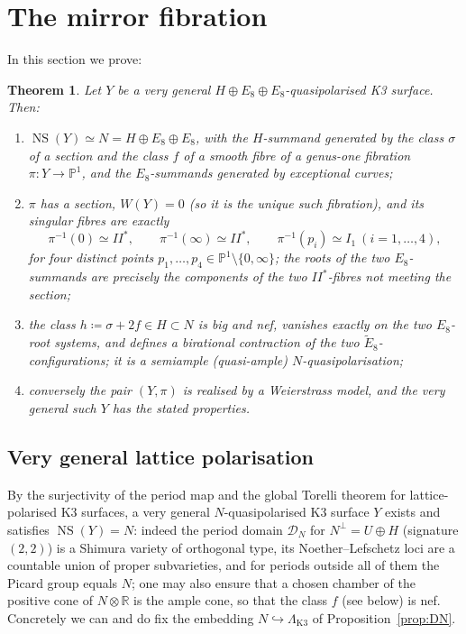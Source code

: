 \documentclass[11pt]{article}
\newtheorem{theorem}{Theorem}[section]
\newcommand{\PP}{\mathbb{P}}
\newcommand{\bR}{\mathbb{R}}
\DeclareMathOperator{\NS}{NS}
\begin{document}
\section{The mirror fibration}\label{sec:fibration}

In this section we prove:

\begin{theorem}\label{thm:fibration}
Let $Y$ be a very general $H\oplus E_8\oplus E_8$-quasipolarised K3 surface.
Then:
\begin{enumerate}[label=(\alph*),leftmargin=2em]
\item $\NS(Y)\simeq N=H\oplus E_8\oplus E_8$, with the $H$-summand generated
by the class $\sigma$ of a section and the class $f$ of a smooth fibre of a
genus-one fibration $\pi\colon Y\to\PP^1$, and the $E_8$-summands generated
by exceptional curves;
\item $\pi$ has a section, $W(Y)=0$ (so it is the unique such fibration), and
its singular fibres are exactly
\[
\pi^{-1}(0)\simeq II^*,\qquad
\pi^{-1}(\infty)\simeq II^*,\qquad
\pi^{-1}(p_i)\simeq I_1\ (i=1,\dots,4),
\]
for four distinct points $p_1,\dots,p_4\in\PP^1\setminus\{0,\infty\}$;
the roots of the two $E_8$-summands are precisely the components of the two
$II^*$-fibres not meeting the section;

      
\item the class $h\coloneqq\sigma+2f\in H\subset N$ is big and nef, vanishes
exactly on the two $E_8$-root systems, and defines a birational contraction
of the two $\tilde E_8$-configurations; it is a semiample (quasi-ample)
$N$-quasipolarisation;
\item conversely the pair $(Y,\pi)$ is realised by a Weierstrass model, and
the very general such $Y$ has the stated properties.

\end{enumerate}
\end{theorem}

\subsection{Very general lattice polarisation}

By the surjectivity of the period map and the global Torelli theorem for
lattice-polarised K3 surfaces, a very general $N$-quasipolarised K3 surface
$Y$ exists and satisfies $\NS(Y)=N$: indeed the period domain
$\mathcal D_N$ for $N^{\perp}=U\oplus H$ (signature $(2,2)$) is a Shimura
variety of orthogonal type, its Noether--Lefschetz loci are a countable
union of proper subvarieties, and for periods outside all of them the
Picard group equals $N$; one may also ensure that a chosen chamber of the
positive cone of $N\otimes\bR$ is the ample cone, so that the class $f$ (see
below) is nef. Concretely we can and do fix the embedding
$N\hookrightarrow\Lambda_{\mathrm{K3}}$ of Proposition~\ref{prop:DN}.
\end{document}
